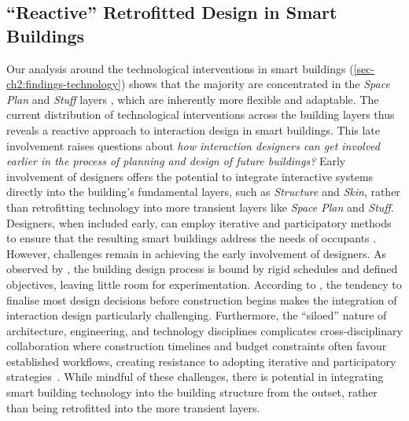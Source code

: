 \subsection{``Reactive'' Retrofitted Design in Smart Buildings}
Our analysis around the technological interventions in smart buildings (\autoref{sec-ch2:findings-technology}) shows that the majority are concentrated in the \textit{Space Plan} and \textit{Stuff} layers \cite{brand1995buildings}, which are inherently more flexible and adaptable. The current distribution of technological interventions across the building layers thus reveals a reactive approach to interaction design in smart buildings. This late involvement raises questions about \emph{how interaction designers can get involved earlier in the process of planning and design of future buildings?} Early involvement of designers offers the potential to integrate interactive systems directly into the building’s fundamental layers, such as \textit{Structure} and \textit{Skin}, rather than retrofitting technology into more transient layers like \textit{Space Plan} and \textit{Stuff}. Designers, when included early, can employ iterative and participatory methods to ensure that the resulting smart buildings address the needs of occupants \cite{alavi2018hide}. However, challenges remain in achieving the early involvement of designers. As observed by \citet{verma2017studying}, the building design process is bound by rigid schedules and defined objectives, leaving little room for experimentation. According to \citet{verma2017studying}, the tendency to finalise most design decisions before construction begins makes the integration of interaction design particularly challenging. Furthermore, the ``siloed'' nature of architecture, engineering, and technology disciplines complicates cross-disciplinary collaboration where construction timelines and budget constraints often favour established workflows, creating resistance to adopting iterative and participatory strategies~\cite{verma2017studying}.
While mindful of these challenges, there is potential in integrating smart building technology into the building structure from the outset, rather than being retrofitted into the more transient layers.